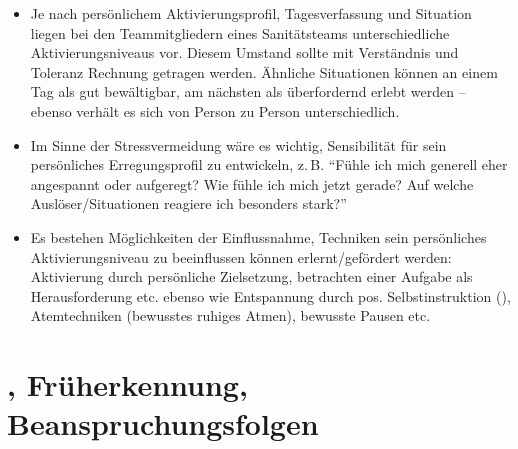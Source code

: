 {\begin{itemize}
  \item Je nach persönlichem Aktivierungsprofil,
  Tagesverfassung und Situation liegen bei den
  Teammitgliedern eines Sanitätsteams unterschiedliche
  Aktivierungsniveaus vor. Diesem Umstand sollte mit
  Verständnis und Toleranz Rechnung getragen werden.
  Ähnliche Situationen können an einem Tag als gut
  bewältigbar, am nächsten als überfordernd erlebt werden --
  ebenso verhält es sich von Person zu Person
  unterschiedlich.
  \item Im Sinne der Stressvermeidung wäre es wichtig,
  Sensibilität für sein persönliches Erregungsprofil zu
  entwickeln, z.\,B. \enquote{Fühle ich mich generell eher
  angespannt oder aufgeregt? Wie fühle ich mich jetzt gerade? Auf welche
  Auslöser/Situationen reagiere ich besonders stark?}
  \item Es bestehen Möglichkeiten der Einflussnahme, Techniken
  sein persönliches Aktivierungsniveau zu beeinflussen können
  erlernt/gefördert werden: Aktivierung durch persönliche
  Zielsetzung, betrachten einer Aufgabe als Herausforderung
  etc. ebenso wie Entspannung durch pos. Selbstinstruktion
  (), Atemtechniken
  (bewusstes ruhiges Atmen), bewusste Pausen etc.
\end{itemize}
}%



\section{, Früherkennung, 
Beanspruchungsfolgen}



\subsection{}
\label{topic:stressauswirkungen-psi}

